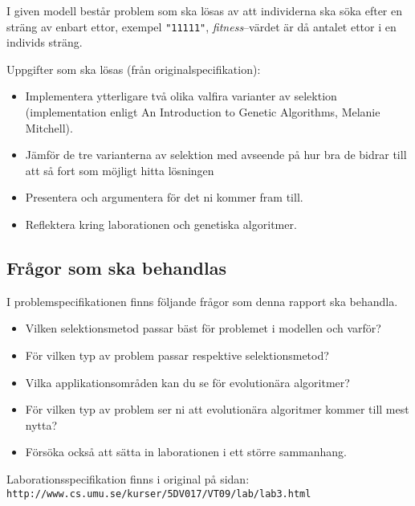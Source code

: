 \documentclass[titlepage, a4paper, 12pt]{article}
\begin{document}
I given modell består problem som ska lösas av att individerna ska
söka efter en sträng av enbart ettor, exempel \verb!"11111"!,
\textit{fitness}–värdet är då antalet ettor i en individs sträng.

Uppgifter som ska lösas (från originalspecifikation):
\begin{itemize}
\item Implementera ytterligare två olika valfira varianter av
  selektion (implementation enligt An Introduction to Genetic
  Algorithms, Melanie Mitchell).
\item Jämför de tre varianterna av selektion med avseende på hur bra
  de bidrar till att så fort som möjligt hitta lösningen
\item Presentera och argumentera för det ni kommer fram till.
\item Reflektera kring laborationen och genetiska algoritmer.
\end{itemize}


\subsection{Frågor som ska behandlas}
I problemspecifikationen finns följande frågor som denna rapport ska
behandla.

\begin{itemize}
\item Vilken selektionsmetod passar bäst för problemet i modellen och varför?
\item För vilken typ av problem passar respektive selektionsmetod?
\item Vilka applikationsområden kan du se för evolutionära algoritmer?
\item För vilken typ av problem ser ni att evolutionära algoritmer
  kommer till mest nytta?
\item Försöka också att sätta in laborationen i ett större sammanhang. 
\end{itemize}
Laborationsspecifikation finns i original på sidan:\\
\verb!http://www.cs.umu.se/kurser/5DV017/VT09/lab/lab3.html!
\end{document}
